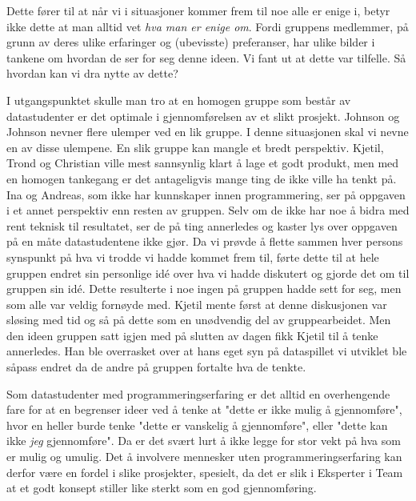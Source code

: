 	Dette fører til at når vi i situasjoner kommer frem til noe alle er enige i, betyr ikke dette at man alltid vet \emph{hva man er enige om}. Fordi gruppens medlemmer, på grunn av deres ulike erfaringer og (ubevisste) preferanser, har ulike bilder i tankene om hvordan de ser for seg denne ideen. Vi fant ut at dette var tilfelle. Så hvordan kan vi dra nytte av dette?

	I utgangspunktet skulle man tro at en homogen gruppe som består av datastudenter er det optimale i gjennomførelsen av et slikt prosjekt. Johnson og Johnson nevner flere ulemper ved en lik gruppe. I denne situasjonen skal vi nevne en av disse ulempene. En slik gruppe kan mangle et bredt perspektiv. Kjetil, Trond og Christian ville mest sannsynlig klart å lage et godt produkt, men med en homogen tankegang er det antageligvis mange ting de ikke ville ha tenkt på. Ina og Andreas, som ikke har kunnskaper innen programmering, ser på oppgaven i et annet perspektiv enn resten av gruppen. Selv om de ikke har noe å bidra med rent teknisk til resultatet, ser de på ting annerledes og kaster lys over oppgaven på en måte datastudentene ikke gjør. Da vi prøvde å flette sammen hver persons synspunkt på hva vi trodde vi hadde kommet frem til, førte dette til at hele gruppen endret sin personlige idé over hva vi hadde diskutert og gjorde det om til gruppen sin idé. Dette resulterte i noe ingen på gruppen hadde sett for seg, men som alle var veldig fornøyde med.  Kjetil mente først at denne diskusjonen var sløsing med tid og så på dette som en unødvendig del av gruppearbeidet. Men den ideen gruppen satt igjen med på slutten av dagen fikk Kjetil til å tenke annerledes. Han ble overrasket over at hans eget syn på dataspillet vi utviklet ble såpass endret da de andre på gruppen fortalte hva de tenkte. 


Som datastudenter med programmeringserfaring er det alltid en overhengende fare for at en begrenser ideer ved å tenke at "dette er ikke mulig å gjennomføre", hvor en heller burde tenke "dette er vanskelig å gjennomføre", eller "dette kan ikke  \emph{jeg} gjennomføre". Da er det svært lurt å ikke legge for stor vekt på hva som er mulig og umulig. Det å involvere mennesker uten programmeringserfaring kan derfor være en fordel i slike prosjekter, spesielt, da det er slik i Eksperter i Team at et godt konsept stiller like sterkt som en god gjennomføring. 


